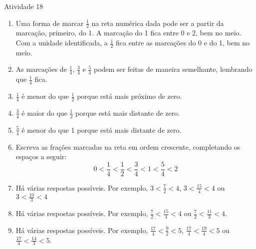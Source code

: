\documentclass[oneside]{book}
\begin{document}
\begin{multicols}{2}
  
\begin{resposta*}{Atividade 18}
  
\begin{center}
\end{center}
  
  
\begin{enumerate} [\quad a)] %
    \item       Uma forma de marcar       $\frac{1}{2}$       na reta numérica dada pode ser a partir da marcação, primeiro, do 1. A marcação do 1 fica entre 0 e 2, bem no meio. Com a unidade identificada, a       $\frac{1}{2}$        fica entre as marcações do 0 e do 1, bem no meio.   
    \item       As marcações de       $\frac{1}{4}$,       $\frac{3}{4}$       e       $\frac{5}{4}$       podem ser feitas de maneira semelhante, lembrando que       $\frac{1}{4}$       fica.
    \item             $\frac{1}{4}$       é menor do que       $\frac{1}{2}$       porque está mais próximo de zero.
    \item             $\frac{3}{4}$       é maior do que        $\frac{1}{2}$       porque está mais distante de zero.
    \item             $\frac{5}{4}$       é menor do que 1 porque está mais distante de zero.
    \item       Escreva as frações marcadas na reta em ordem crescente, completando os espaços a seguir:
  $$0 < \frac{1}{4} < \frac{1}{2}< \frac{3}{4} < 1 < \frac{5}{4} < 2$$     
    \item       Há várias respostas possíveis. Por exemplo,       $3 < \frac{7}{2} < 4$,       $3 < \frac{15}{4} < 4$         ou         $3 < \frac{10}{3} < 4$
    \item       Há várias respostas possíveis. Por exemplo,       $\frac{7}{2} < \frac{15}{4} < 4$ ou $\frac{7}{2} < \frac{11}{3} < 4$.
    \item       Há várias respostas possíveis. Por exemplo,       $\frac{17}{4} < \frac{9}{2} < 5$, $\frac{17}{4} < \frac{19}{4} < 5$ ou $\frac{17}{4} < \frac{14}{3} < 5$.
\end{enumerate} %
  
  
\end{resposta*}



\end{multicols}
\end{document}
